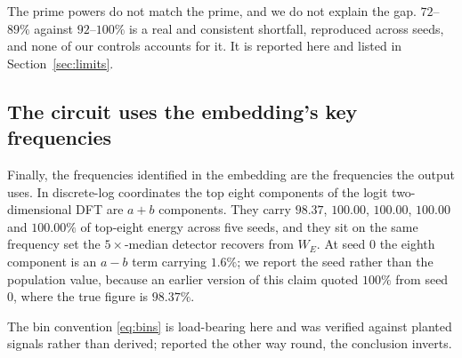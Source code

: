The prime powers do not match the prime, and we do not explain the gap. $72$--$89\%$
against $92$--$100\%$ is a real and consistent shortfall, reproduced across seeds, and none of
our controls accounts for it. It is reported here and listed in
Section~\ref{sec:limits}.

\subsection{The circuit uses the embedding's key frequencies}
\label{sec:clock-circuit}

Finally, the frequencies identified in the embedding are the frequencies the output
uses. In discrete-log coordinates the top eight components of the logit two-dimensional DFT
are $a+b$ components. They carry $98.37$, $100.00$, $100.00$, $100.00$ and $100.00\%$ of
top-eight energy across five seeds, and they sit on the same frequency set the
$5\times$-median detector recovers from $W_{E}$. At seed $0$ the eighth component is an $a-b$ term carrying
$1.6\%$; we report the seed rather than the population value, because an earlier version of
this claim quoted $100\%$ from seed $0$, where the true figure is $98.37\%$.

The bin convention \eqref{eq:bins} is load-bearing here and was verified against planted
signals rather than derived; reported the other way round, the conclusion inverts.
